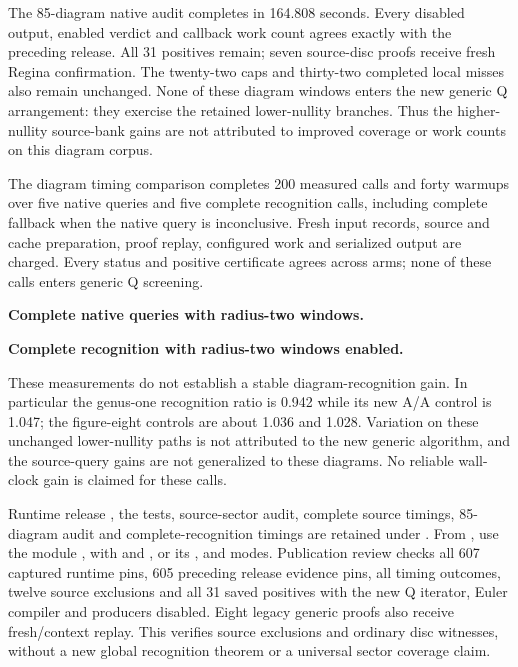 The 85-diagram native audit completes in 164.808 seconds. Every disabled
output, enabled verdict and callback work count agrees exactly with the
preceding release. All 31 positives remain; seven source-disc proofs receive
fresh Regina confirmation. The twenty-two caps and thirty-two completed
local misses also remain unchanged. None of these diagram windows enters
the new generic Q arrangement: they exercise the retained lower-nullity
branches. Thus the higher-nullity source-bank gains are not attributed to
improved coverage or work counts on this diagram corpus.

The diagram timing comparison completes 200 measured calls and forty
warmups over five native queries and five complete recognition calls,
including complete fallback when the native query is inconclusive. Fresh
input records, source and cache preparation, proof replay, configured work
and serialized output are charged. Every status and positive certificate
agrees across arms; none of these calls enters generic Q screening.

\textbf{Complete native queries with radius-two windows.}

\textbf{Complete recognition with radius-two windows enabled.}


These measurements do not establish a stable diagram-recognition gain.
In particular the genus-one recognition ratio is 0.942 while its new A/A
control is 1.047; the figure-eight controls are about 1.036 and 1.028.
Variation on these unchanged lower-nullity paths is not attributed to the
new generic algorithm, and the source-query gains are not generalized to
these diagrams. No reliable wall-clock gain is claimed for these calls.

Runtime release , the tests, source-sector audit, complete
source timings, 85-diagram audit and complete-recognition timings are
retained under . From , use
the module , with
 and , or its
,  and  modes.
Publication review checks all 607 captured runtime pins, 605 preceding
release evidence pins, all timing outcomes, twelve source exclusions and
all 31 saved positives with the new Q iterator, Euler compiler and producers
disabled. Eight legacy generic proofs also receive fresh/context replay.
This verifies source exclusions and ordinary disc witnesses, without a new
global recognition theorem or a universal sector coverage claim.
